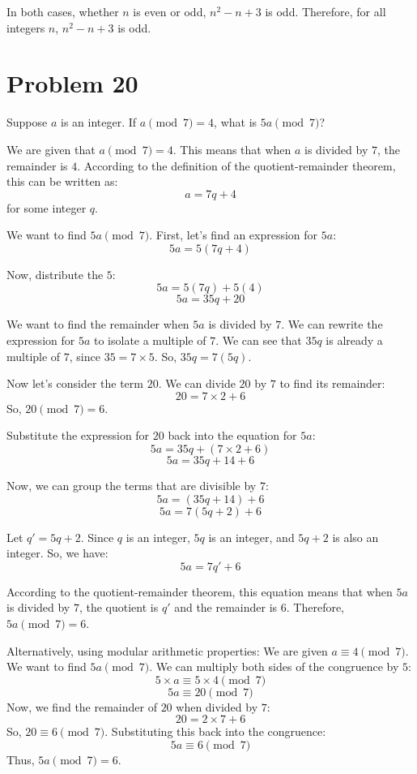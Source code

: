 \documentclass{article}
\begin{document}
In both cases, whether $n$ is even or odd, $n^2 - n + 3$ is odd.
Therefore, for all integers $n$, $n^2 - n + 3$ is odd.

\newpage

\section*{Problem 20}
Suppose $a$ is an integer. If $a \pmod{7} = 4$, what is $5a \pmod{7}$?

We are given that $a \pmod{7} = 4$. This means that when $a$ is divided by $7$, the remainder is $4$.
According to the definition of the quotient-remainder theorem, this can be written as:
$$ a = 7q + 4 $$
for some integer $q$.

We want to find $5a \pmod{7}$. First, let's find an expression for $5a$:
$$ 5a = 5(7q + 4) $$

Now, distribute the $5$:
$$ 5a = 5(7q) + 5(4) $$
$$ 5a = 35q + 20 $$

We want to find the remainder when $5a$ is divided by $7$. We can rewrite the expression for $5a$ to isolate a multiple of $7$.
We can see that $35q$ is already a multiple of $7$, since $35 = 7 \times 5$.
So, $35q = 7(5q)$.

Now let's consider the term $20$. We can divide $20$ by $7$ to find its remainder:
$$ 20 = 7 \times 2 + 6 $$
So, $20 \pmod{7} = 6$.

Substitute the expression for $20$ back into the equation for $5a$:
$$ 5a = 35q + (7 \times 2 + 6) $$
$$ 5a = 35q + 14 + 6 $$

Now, we can group the terms that are divisible by $7$:
$$ 5a = (35q + 14) + 6 $$
$$ 5a = 7(5q + 2) + 6 $$

Let $q' = 5q + 2$. Since $q$ is an integer, $5q$ is an integer, and $5q + 2$ is also an integer.
So, we have:
$$ 5a = 7q' + 6 $$

According to the quotient-remainder theorem, this equation means that when $5a$ is divided by $7$, the quotient is $q'$ and the remainder is $6$.
Therefore, $5a \pmod{7} = 6$.

Alternatively, using modular arithmetic properties:
We are given $a \equiv 4 \pmod{7}$.
We want to find $5a \pmod{7}$.
We can multiply both sides of the congruence by $5$:
$$ 5 \times a \equiv 5 \times 4 \pmod{7} $$
$$ 5a \equiv 20 \pmod{7} $$
Now, we find the remainder of $20$ when divided by $7$:
$$ 20 = 2 \times 7 + 6 $$
So, $20 \equiv 6 \pmod{7}$.
Substituting this back into the congruence:
$$ 5a \equiv 6 \pmod{7} $$
Thus, $5a \pmod{7} = 6$.
\end{document}
